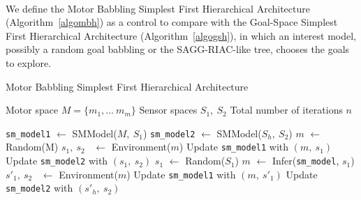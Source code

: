 \documentclass[12pt]{article}
\begin{document}
			\paragraph{}
			We define the Motor Babbling Simplest First Hierarchical Architecture (Algorithm~\ref{algombh}) as a control to compare with the
			Goal-Space Simplest First Hierarchical Architecture (Algorithm~\ref{algogsh}), in which an interest model, possibly a random goal 
			babbling or the SAGG-RIAC-like tree, chooses the goals to explore.
			
			
			
			\begin{algorithm}
				\caption{Motor Babbling Simplest First Hierarchical Architecture}
				\label{algombh}
				\begin{algorithmic}[1]
					\Require Motor space $M = \{m_1, ...~ m_m\}$
					\Require Sensor spaces $S_1,~S_2$
					\Require Total number of iterations $n$
					
					\State \texttt{sm\_model1} $\gets$ SMModel($M,~S_1$)
					\State \texttt{sm\_model2} $\gets$ SMModel($S_h,~S_2$)
						\State $m$ $\gets$ Random(M)
						\State $s_1,~s_2$~ $\gets$ Environment($m$)
						\State Update \texttt{sm\_model1} with $(m,~s_1)$
						\State Update \texttt{sm\_model2} with $(s_1,~s_2)$
					\EndFor
						\State $s_1$ $\gets$ Random($S_1$)
						\State $m$ $\gets$ Infer(\texttt{sm\_model}, $s_1$)
						\State $s'_1,~s_2$~ $\gets$ Environment($m$)
						\State Update \texttt{sm\_model1} with $(m,~s'_1)$
						\State Update \texttt{sm\_model2} with $(s'_h,~s_2)$
					\EndFor
				\end{algorithmic}
			\end{algorithm}
			
\end{document}
